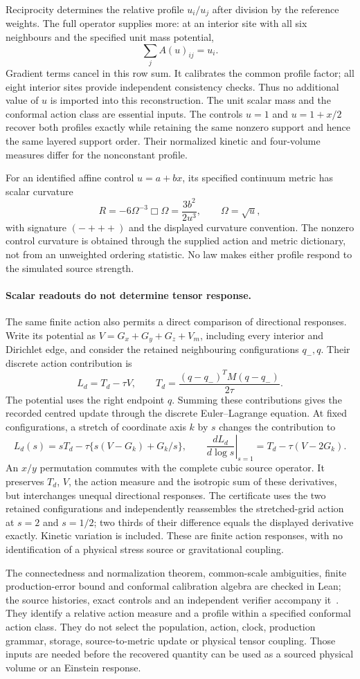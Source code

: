 Reciprocity determines the relative profile $u_i/u_j$ after division by
the reference weights. The full operator supplies more: at an interior
site with all six neighbours and the specified unit mass potential,
\[
 \sum_j A(u)_{ij}=u_i.
\]
Gradient terms cancel in this row sum. It calibrates the common profile
factor; all eight interior sites provide independent consistency checks.
Thus no additional value of $u$ is imported into this reconstruction.
The unit scalar mass and the conformal action class are essential
inputs. The controls $u=1$ and $u=1+x/2$ recover both profiles exactly
while retaining the same nonzero support and hence the same layered
support order. Their normalized kinetic and four-volume measures differ
for the nonconstant profile.

For an identified affine control $u=a+bx$, its specified continuum
metric has scalar curvature
\[
 R=-6\Omega^{-3}\Box\Omega
   =\frac{3b^2}{2u^3},\qquad \Omega=\sqrt u,
\]
with signature $(-+++)$ and the displayed curvature convention.
The nonzero control curvature is obtained through the supplied action
and metric dictionary, not from an unweighted ordering statistic. No
law makes either profile respond to the simulated source strength.

\paragraph{Scalar readouts do not determine tensor response.}
The same finite action also permits a direct comparison of directional
responses. Write its potential as $V=G_x+G_y+G_z+V_m$, including every
interior and Dirichlet edge, and consider the retained neighbouring
configurations $q_-,q$. Their discrete action contribution is
\[
 L_d=T_d-\tau V,\qquad
 T_d=\frac{(q-q_-)^TM(q-q_-)}{2\tau}.
\]
The potential uses the right endpoint $q$. Summing these contributions gives the recorded centred update through
the discrete Euler--Lagrange equation. At fixed configurations, a stretch
of coordinate axis $k$ by $s$ changes the contribution to
\[
 L_d(s)=sT_d-\tau\{s(V-G_k)+G_k/s\},\qquad
 \left.\frac{dL_d}{d\log s}\right|_{s=1}
 =T_d-\tau(V-2G_k).
\]
An $x/y$ permutation commutes with the complete cubic source operator.
It preserves $T_d$, $V$, the action measure and the isotropic sum of
these derivatives, but interchanges unequal directional responses.
The certificate uses the two retained configurations and independently
reassembles the stretched-grid action at $s=2$ and $s=1/2$; two thirds
of their difference equals the displayed derivative exactly. Kinetic
variation is included. These are finite action responses, with no
identification of a physical stress source or gravitational coupling.

The connectedness and normalization theorem, common-scale ambiguities,
finite production-error bound and conformal calibration algebra are
checked in Lean; the source histories, exact
controls and an independent verifier accompany it~\cite{ophrepo}. They identify a relative action
measure and a profile within a specified conformal action class. They do
not select the population, action, clock, production grammar, storage,
source-to-metric update or physical tensor coupling. Those inputs are
needed before the recovered quantity can be used as a sourced physical
volume or an Einstein response.
